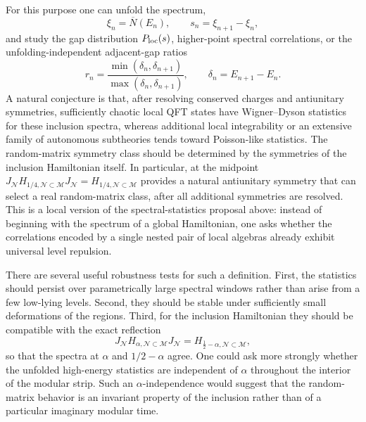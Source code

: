 \documentclass[a4paper,11pt]{article}
\theoremstyle{definition}
\newcommand{\mN}{\mathcal{N}}
\newcommand{\mM}{\mathcal{M}}
\begin{document}
For this purpose one can unfold the spectrum,
\begin{equation}
    \xi_n=\overline N(E_n),
    \qquad
    s_n=\xi_{n+1}-\xi_n,
    \label{eq:local-unfolded-gaps}
\end{equation}
and study the gap distribution $P_{\rm loc}(s)$, higher-point spectral correlations, or the unfolding-independent adjacent-gap ratios
\begin{equation}
    r_n
    =
    \frac{\min(\delta_n,\delta_{n+1})}
         {\max(\delta_n,\delta_{n+1})},
    \qquad
    \delta_n=E_{n+1}-E_n .
    \label{eq:local-gap-ratio}
\end{equation}
A natural conjecture is that, after resolving conserved charges and antiunitary symmetries, sufficiently chaotic local QFT states have Wigner--Dyson statistics for these inclusion spectra, whereas additional local integrability or an extensive family of autonomous subtheories tends toward Poisson-like statistics.  The random-matrix symmetry class should be determined by the symmetries of the inclusion Hamiltonian itself.  In particular, at the midpoint $J_{\mN}H_{1/4,\mN\subset\mM}J_{\mN}=H_{1/4,\mN\subset\mM}$ provides a natural antiunitary symmetry that can select a real random-matrix class, after all additional symmetries are resolved.  This is a local version of the spectral-statistics proposal above: instead of beginning with the spectrum of a global Hamiltonian, one asks whether the correlations encoded by a single nested pair of local algebras already exhibit universal level repulsion.

There are several useful robustness tests for such a definition.  First, the statistics should persist over parametrically large spectral windows rather than arise from a few low-lying levels.  Second, they should be stable under sufficiently small deformations of the regions.  Third, for the inclusion Hamiltonian they should be compatible with the exact reflection
\begin{equation}
    J_{\mN}H_{\alpha,\mN\subset\mM}J_{\mN}
    =
    H_{\frac12-\alpha,\mN\subset\mM},
\end{equation}
so that the spectra at $\alpha$ and $1/2-\alpha$ agree.  One could ask more strongly whether the unfolded high-energy statistics are independent of $\alpha$ throughout the interior of the modular strip.  Such an $\alpha$-independence would suggest that the random-matrix behavior is an invariant property of the inclusion rather than of a particular imaginary modular time.
\end{document}
